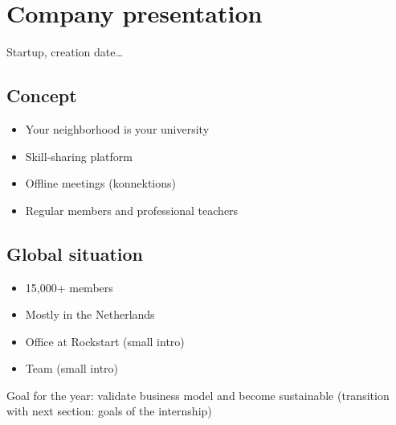 \section{Company presentation}
\label{sec:company}

Startup, creation date\ldots

\subsection{Concept}
\label{ssec:concept}

\begin{itemize}
    \item \guillemotleft Your neighborhood is your university \guillemotright
    \item Skill-sharing platform
    \item Offline meetings (konnektions)
    \item Regular members and professional teachers
\end{itemize}

\subsection{Global situation}
\label{ssec:situation}

\begin{itemize}
    \item 15,000+ members
    \item Mostly in the Netherlands
    \item Office at Rockstart (small intro)
    \item Team (small intro)
\end{itemize}

Goal for the year: validate business model and become sustainable (transition with next section: goals of the internship)
